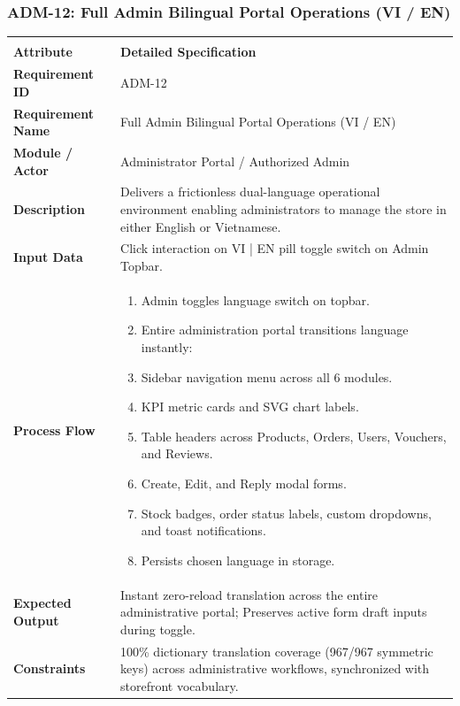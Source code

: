 \documentclass[12pt,a4paper,oneside]{report}
\begin{document}
\subsubsection{ADM-12: Full Admin Bilingual Portal Operations (VI / EN)}
\begin{longtable}{|p{3.6cm}|p{11.9cm}|}
\hline
\rowcolor{PrimaryBrown}
\multicolumn{2}{|p{15.5cm}|}{\textbf{\textcolor{white}{Functional Specification: ADM-12 -- Full Admin Bilingual Portal Operations (VI / EN)}}} \\
\hline
\endfirsthead
\hline
\rowcolor{PrimaryBrown}
\multicolumn{2}{|p{15.5cm}|}{\textbf{\textcolor{white}{Functional Specification: ADM-12 (Continued)}}} \\
\hline
\textbf{Attribute} & \textbf{Detailed Specification} \\
\hline
\endhead
\hline
\endfoot
\textbf{Requirement ID} & ADM-12 \\
\hline
\textbf{Requirement Name} & Full Admin Bilingual Portal Operations (VI / EN) \\
\hline
\textbf{Module / Actor} & Administrator Portal / Authorized Admin \\
\hline
\textbf{Description} & Delivers a frictionless dual-language operational environment enabling administrators to manage the store in either English or Vietnamese. \\
\hline
\textbf{Input Data} & Click interaction on VI | EN pill toggle switch on Admin Topbar. \\
\hline
\textbf{Process Flow} & \begin{enumerate}[leftmargin=*,nosep,topsep=2pt]
  \item Admin toggles language switch on topbar.
  \item Entire administration portal transitions language instantly:
  \item Sidebar navigation menu across all 6 modules.
  \item KPI metric cards and SVG chart labels.
  \item Table headers across Products, Orders, Users, Vouchers, and Reviews.
  \item Create, Edit, and Reply modal forms.
  \item Stock badges, order status labels, custom dropdowns, and toast notifications.
  \item Persists chosen language in storage.
\end{enumerate} \\
\hline
\textbf{Expected Output} & Instant zero-reload translation across the entire administrative portal; Preserves active form draft inputs during toggle. \\
\hline
\textbf{Constraints} & 100\% dictionary translation coverage (967/967 symmetric keys) across administrative workflows, synchronized with storefront vocabulary. \\
\hline
\end{longtable}
\end{document}
